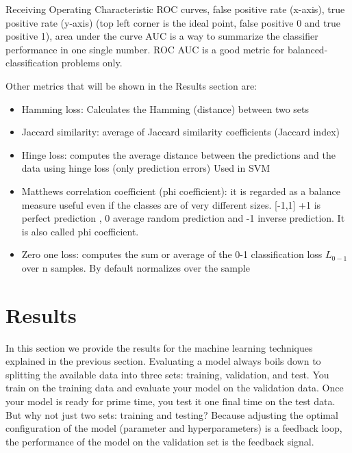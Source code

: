 \documentclass[11pt]{article}
\begin{document}
Receiving Operating Characteristic ROC curves, false positive rate (x-axis), true positive rate (y-axis) (top left corner is the ideal point, false positive 0 and true positive 1), area under the curve AUC is a way to summarize the classifier performance in one single number. ROC AUC is a good metric for balanced-classification problems only.

Other metrics that will be shown in the Results section are:
\begin{itemize}
	\item Hamming loss: Calculates the Hamming (distance) between two sets
	\item Jaccard similarity: average of Jaccard similarity coefficients (Jaccard index)
	\item Hinge loss: computes the average distance between the predictions and the data using hinge loss (only prediction errors) Used in SVM
	\item Matthews correlation coefficient (phi coefficient): it is regarded as a balance measure useful even if the classes are of very different sizes. [-1,1] +1 is perfect prediction , 0 average random prediction and -1 inverse prediction. It is also called phi coefficient.
	\item Zero one loss: computes the sum or average of the 0-1 classification loss $L_{0-1}$ over n samples. By default normalizes over the sample
\end{itemize}


\section{Results}
\label{se:res}

In this section we provide the results for the machine learning techniques explained in the previous section.
Evaluating a model always boils down to splitting the available data into three sets: training, validation, and test. You train on the training data and evaluate your model on the validation data. Once your model is ready for prime time, you test it one final time on the test data. 
But why not just two sets: training and testing? Because adjusting the optimal configuration of the model (parameter and hyperparameters) is a feedback loop, the performance of the model on the validation set is the feedback signal.
\end{document}
